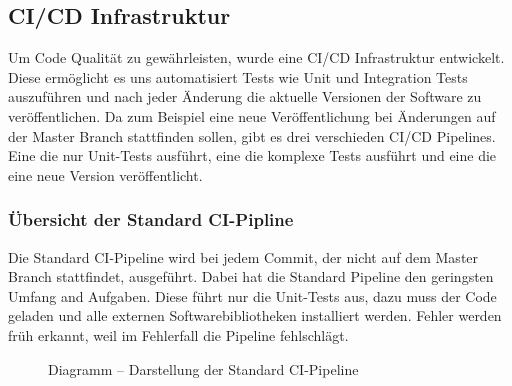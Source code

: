 \subsection{CI/CD Infrastruktur}
Um Code Qualität zu gewährleisten, wurde eine \ac{CI/CD} Infrastruktur entwickelt.
Diese ermöglicht es uns automatisiert Tests wie Unit und Integration Tests auszuführen und nach jeder Änderung die aktuelle Versionen der Software zu veröffentlichen.
Da zum Beispiel eine neue Veröffentlichung bei Änderungen auf der Master Branch stattfinden sollen, gibt es drei verschieden \ac{CI/CD} Pipelines.
Eine die nur Unit-Tests ausführt, eine die komplexe Tests ausführt und eine die eine neue Version veröffentlicht.

\subsubsection{Übersicht der Standard \ac{CI}-Pipline}
Die Standard \ac{CI}-Pipeline wird bei jedem Commit, der nicht auf dem Master Branch stattfindet, ausgeführt. Dabei hat die Standard Pipeline den geringsten Umfang and Aufgaben.
Diese führt nur die Unit-Tests aus, dazu muss der Code geladen und alle externen Softwarebibliotheken installiert werden. Fehler werden früh erkannt, weil im Fehlerfall die Pipeline fehlschlägt.
\begin{figure}[!htbp]
    \centering    
    \usetikzlibrary{positioning}
\caption{Diagramm – Darstellung der Standard \ac{CI}-Pipeline}
\end{figure}

